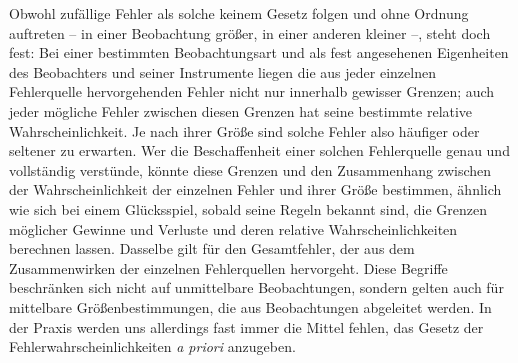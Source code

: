 Obwohl zufällige Fehler als solche keinem Gesetz folgen und ohne Ordnung auftreten – in einer Beobachtung größer, in einer anderen kleiner –, steht doch fest: Bei einer bestimmten Beobachtungsart und als fest angesehenen Eigenheiten des Beobachters und seiner Instrumente liegen die aus jeder einzelnen Fehlerquelle hervorgehenden Fehler nicht nur innerhalb gewisser Grenzen; auch jeder mögliche Fehler zwischen diesen Grenzen hat seine bestimmte relative Wahrscheinlichkeit. Je nach ihrer Größe sind solche Fehler also häufiger oder seltener zu erwarten. Wer die Beschaffenheit einer solchen Fehlerquelle genau und vollständig verstünde, könnte diese Grenzen und den Zusammenhang zwischen der Wahrscheinlichkeit der einzelnen Fehler und ihrer Größe bestimmen, ähnlich wie sich bei einem Glücksspiel, sobald seine Regeln bekannt sind, die Grenzen möglicher Gewinne und Verluste und deren relative Wahrscheinlichkeiten berechnen lassen. Dasselbe gilt für den Gesamtfehler, der aus dem Zusammenwirken der einzelnen Fehlerquellen hervorgeht. Diese Begriffe beschränken sich nicht auf unmittelbare Beobachtungen, sondern gelten auch für mittelbare Größenbestimmungen, die aus Beobachtungen abgeleitet werden. In der Praxis werden uns allerdings fast immer die Mittel fehlen, das Gesetz der Fehlerwahrscheinlichkeiten \textit{a priori} anzugeben.

